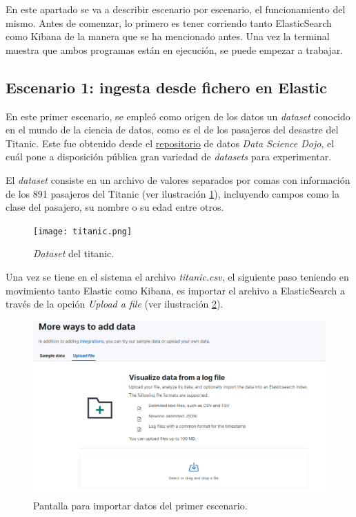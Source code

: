 En este apartado se va a describir escenario por escenario, el funcionamiento del mismo. Antes de comenzar, lo primero es tener corriendo tanto ElasticSearch como Kibana de la manera que se ha mencionado antes. Una vez la terminal muestra que ambos programas están en ejecución, se puede empezar a trabajar.

\subsection{Escenario 1: ingesta desde fichero en Elastic}
En este primer escenario, se empleó como origen de los datos un \textit{dataset} conocido en el mundo de la ciencia de datos, como es el de los pasajeros del desastre del Titanic. Este fue obtenido desde el \href{https://github.com/datasciencedojo/datasets/blob/master/titanic.csv}{repositorio} de datos \textit{Data Science Dojo}, el cuál pone a disposición pública gran variedad de \textit{datasets} para experimentar.

El \textit{dataset} consiste en un archivo de valores separados por comas con información de los 891 pasajeros del Titanic (ver ilustración  \ref{fig:titanic}), incluyendo campos como la clase del pasajero, su nombre o su edad entre otros.

\begin{figure}
    \centering
    \texttt{[image: titanic.png]}
    \caption{\textit{Dataset} del titanic.}
    \label{fig:titanic}
\end{figure}

Una vez se tiene en el sistema el archivo \textit{titanic.csv}, el siguiente paso teniendo en movimiento tanto Elastic como Kibana, es importar el archivo a ElasticSearch a través de la opción \textit{Upload a file} (ver ilustración   \ref{fig:escenario11}).

\begin{figure}
    \centering
    \includegraphics[width=1\linewidth]{img/ingesta1.png}
    \caption{Pantalla para importar datos del primer escenario.}
    \label{fig:escenario11}
\end{figure}

